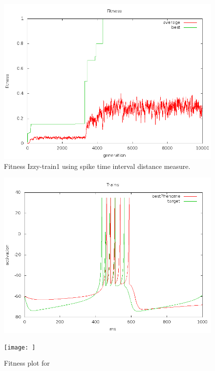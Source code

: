 \documentclass[a4paper]{article}
\begin{document}
\newpage

\begin{figure}[htb!]
  \centering
  \includegraphics[width=\textwidth]{SpikeInterval-izzy1-fitness-plot.png}
  \caption{Fitness Izzy-train1 using spike time interval distance measure.}
\end{figure}

\begin{figure}[htb!]
  \centering
  \includegraphics[width=\textwidth]{SpikeInterval-izzy1-trains-plot.png}
  \caption{}
\end{figure}

\newpage

\begin{figure}[htb!]
  \centering
  \texttt{[image: ]}
  \caption{Fitness plot for}
\end{figure}
\end{document}
